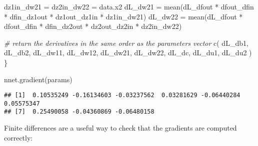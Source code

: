 \documentclass[
  a4paper,
]{article}
\newenvironment{Shaded}{\begin{snugshade}}{\end{snugshade}}
\newcommand{\CommentTok}[1]{\textcolor[rgb]{0.56,0.35,0.01}{\textit{#1}}}
\newcommand{\FunctionTok}[1]{\textcolor[rgb]{0.00,0.00,0.00}{#1}}
\newcommand{\NormalTok}[1]{#1}
\newcommand{\OtherTok}[1]{\textcolor[rgb]{0.56,0.35,0.01}{#1}}
\newcommand{\SpecialCharTok}[1]{\textcolor[rgb]{0.00,0.00,0.00}{#1}}
\begin{document}
\begin{Shaded}
\begin{Highlighting}[]
\NormalTok{  dz1in\_dw21 }\OtherTok{=}\NormalTok{ dz2in\_dw22 }\OtherTok{=}\NormalTok{ data.x2}
\NormalTok{  dL\_dw21 }\OtherTok{=} \FunctionTok{mean}\NormalTok{(dL\_dfout }\SpecialCharTok{*}\NormalTok{ dfout\_dfin }\SpecialCharTok{*}\NormalTok{ dfin\_dz1out }\SpecialCharTok{*}\NormalTok{ dz1out\_dz1in }\SpecialCharTok{*}\NormalTok{ dz1in\_dw21)}
\NormalTok{  dL\_dw22 }\OtherTok{=} \FunctionTok{mean}\NormalTok{(dL\_dfout }\SpecialCharTok{*}\NormalTok{ dfout\_dfin }\SpecialCharTok{*}\NormalTok{ dfin\_dz2out }\SpecialCharTok{*}\NormalTok{ dz2out\_dz2in }\SpecialCharTok{*}\NormalTok{ dz2in\_dw22)}
  
  \CommentTok{\# return the derivatives in the same order as the parameters vector}
  \FunctionTok{c}\NormalTok{(}
\NormalTok{    dL\_db1, dL\_db2,}
\NormalTok{    dL\_dw11, dL\_dw12,}
\NormalTok{    dL\_dw21, dL\_dw22,}
\NormalTok{    dL\_dc, dL\_du1, dL\_du2}
\NormalTok{  )}
\NormalTok{\}}

\FunctionTok{nnet.gradient}\NormalTok{(params)}
\end{Highlighting}
\end{Shaded}

\begin{verbatim}
## [1]  0.10535249 -0.16134603 -0.03237562  0.03281629 -0.06440284  0.05575347
## [7]  0.25490058 -0.04360869 -0.06480158
\end{verbatim}

Finite differences are a useful way to check that the gradients are
computed correctly:
\end{document}
